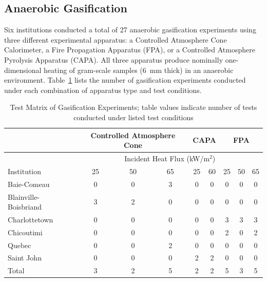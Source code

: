 \documentclass{book}
\begin{document}
\subsection{Anaerobic Gasification}

Six institutions conducted a total of 27 anaerobic gasification experiments using three different experimental apparatus: a Controlled Atmosphere Cone Calorimeter, a Fire Propagation Apparatus (FPA), or a Controlled Atmosphere Pyrolysis Apparatus (CAPA). All three apparatus produce nominally one-dimensional heating of gram-scale samples (6~mm thick) in an anaerobic environment. Table~\ref{Table_7} lists the number of gasification experiments conducted under each combination of apparatus type and test conditions.

\begin{table}[ht]
\caption{Test Matrix of Gasification Experiments; table values indicate number of tests conducted under listed test conditions}
\label{Table_7}
\begin{center}
\begin{tabular}{lcccccccc}
                         & \multicolumn{3}{c}{Controlled Atmosphere Cone} & \multicolumn{2}{c}{CAPA} & \multicolumn{3}{c}{FPA}     \\ \hline
                         & \multicolumn{8}{c}{Incident Heat Flux (kW/m$^2$)}                                                       \\ \hline
Institution              & 25 & 50 & 65 & 25 & 60 & 25 & 50 & 65                                                                   \\ \hline
Baie-Comeau              & 0  & 0  & 3  & 0  & 0  & 0  & 0  & 0                                                                    \\
Blainville-Boisbriand    & 3  & 2  & 0  & 0  & 0  & 0  & 0  & 0                                                                    \\
Charlottetown            & 0  & 0  & 0  & 0  & 0  & 3  & 3  & 3                                                                    \\
Chicoutimi               & 0  & 0  & 0  & 0  & 0  & 2  & 0  & 2                                                                    \\
Quebec                   & 0  & 0  & 2  & 0  & 0  & 0  & 0  & 0                                                                    \\
Saint John               & 0  & 0  & 0  & 2  & 2  & 0  & 0  & 0                                                                    \\ \hline
Total                    & 3  & 2  & 5  & 2  & 2  & 5  & 3  & 5                                                                    \\ \hline
\end{tabular}
\end{center}
\end{table}
\end{document}
